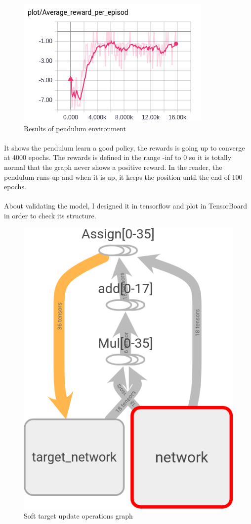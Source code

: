 \documentclass{article}
\begin{document}
\begin{figure}[ht]
  \centering
  \includegraphics[width=.5\textwidth]{avg_per_episode_pendulum}
  \caption{Results of pendulum environment}
  \label{fig:result_pendulum}
\end{figure}

\paragraph{}
It shows the pendulum learn a good policy, the rewards is going up to converge
at 4000 epochs. The rewards is defined in the range -inf to 0 so it is totally
normal that the graph never shows a positive reward. In the render, the pendulum
runs-up and when it is up, it keeps the position until the end of 100 epochs.

\paragraph{}
About validating the model, I designed it in tensorflow and plot in TensorBoard
in order to check its structure.

\begin{figure}[ht]
  \centering
  \includegraphics[width=.5\textwidth]{soft_target}
  \caption{Soft target update operations graph}
  \label{fig:softtargetgraph}
\end{figure}
\end{document}
